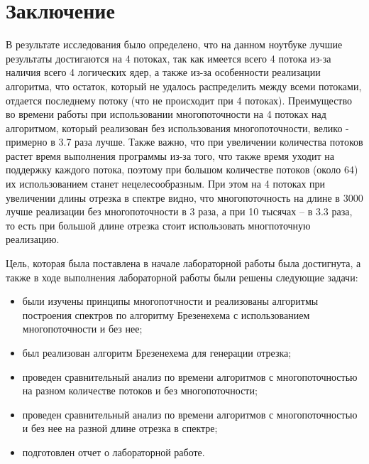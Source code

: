 \chapter*{Заключение}

В результате исследования было определено, что на данном ноутбуке лучшие результаты достигаются на 4 потоках, так как имеется всего 4 потока из-за наличия всего 4 логических ядер, а также из-за особенности реализации алгоритма, что остаток, который не удалось распределить между всеми потоками, отдается последнему потоку (что не происходит при 4 потоках). Преимущество во времени работы при использовании многопоточности на 4 потоках над алгоритмом, который реализован без использования многопоточности, велико - примерно в 3.7 раза лучше. Также важно, что при увеличении количества потоков растет время выполнения программы из-за того, что также время уходит на поддержку каждого потока, поэтому при большом количестве потоков (около 64) их использованием станет нецелесообразным. При этом на 4 потоках при увеличении длины отрезка в спектре видно, что многопоточность на длине в 3000 лучше реализации без многопоточности в 3 раза, а при 10 тысячах -- в 3.3 раза, то есть при большой длине отрезка стоит использовать многпоточную реализацию.

Цель, которая была поставлена в начале лабораторной работы была достигнута, а также в ходе выполнения лабораторной работы были решены следующие задачи:

\begin{itemize}
	\item были изучены принципы многопотчности и реализованы алгоритмы построения спектров по алгоритму Брезенехема с использованием многопоточности и без нее;
    \item был реализован алгоритм Брезенехема для генерации отрезка;
	\item проведен сравнительный анализ по времени алгоритмов с многопоточностью на разном количестве потоков и без многопоточности;
	\item проведен сравнительный анализ по времени алгоритмов с многопоточностью и без нее на разной длине отрезка в спектре;
	\item подготовлен отчет о лабораторной работе.
\end{itemize}